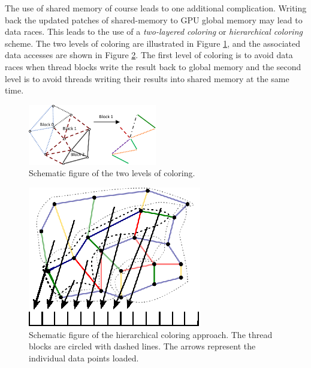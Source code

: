 The use of shared memory of course leads to one additional complication. 
Writing back the updated patches of shared-memory to GPU global memory may lead 
to data races. This leads to the use of a \emph{two-layered coloring} or 
\emph{hierarchical coloring}~\cite{op2} scheme. The two levels of coloring are 
illustrated in Figure \ref{fig:multilevel}, and the associated data accesses are 
shown in Figure \ref{fig:unstructured_hier}. The first level of coloring is to 
avoid data races when thread blocks write the result back to global memory and 
the second level is to avoid threads writing their results into shared memory at 
the same time. 

\begin{figure}[Htpb]
  \centering
  \includegraphics[width=0.5\textwidth]{fig/multilevel.pdf}
  \caption{Schematic figure of the two levels of coloring.}
  \label{fig:multilevel}
\end{figure}

\begin{figure}[Htpb]
  \centering
  \includegraphics{fig/svg/unstructured_hier.eps}
  \caption{Schematic figure of the hierarchical coloring approach. The thread
  blocks are circled with dashed lines. The arrows represent the individual data
  points loaded.}
  \label{fig:unstructured_hier}
\end{figure}

